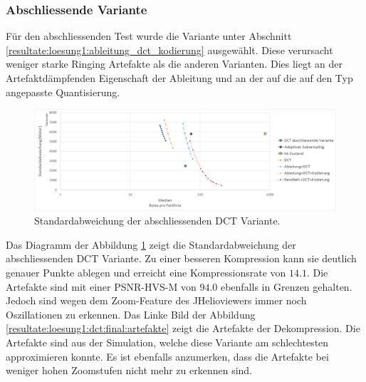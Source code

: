 \subsubsection{Abschliessende Variante}
Für den abschliessenden Test wurde die Variante unter Abschnitt \ref{resultate:loesung1:ableitung_dct_kodierung} ausgewählt. Diese verursacht weniger starke Ringing Artefakte als die anderen Varianten. Dies liegt an der Artefaktdämpfenden Eigenschaft der Ableitung und an der auf die auf den Typ angepasste Quantisierung.
\begin{figure}[!htbp]
	\center	\includegraphics[width=1\textwidth,keepaspectratio]{./pictures/resultate/loesung1/loesung1-12/resultate.png}
	\caption{Standardabweichung der abschliessenden DCT Variante.}	\label{resultate:loesung1:dct:abschliessend:standardabweichung}
\end{figure} 
Das Diagramm der Abbildung \ref{resultate:loesung1:dct:abschliessend:standardabweichung} zeigt die Standardabweichung der abschliessenden DCT Variante. Zu einer besseren Kompression kann sie deutlich genauer Punkte ablegen und erreicht eine Kompressionsrate von $14.1$. Die Artefakte sind mit einer PSNR-HVS-M von $94.0$ ebenfalls in Grenzen gehalten. Jedoch sind wegen dem Zoom-Feature des JHelioviewers immer noch Oszillationen zu erkennen. Das Linke Bild der Abbildung \ref{resultate:loesung1:dct:final:artefakte} zeigt die Artefakte der Dekompression. Die Artefakte sind aus der Simulation, welche diese Variante am schlechtesten approximieren konnte. Es ist ebenfalls anzumerken, dass die Artefakte bei weniger hohen Zoomstufen nicht mehr zu erkennen sind.\\

